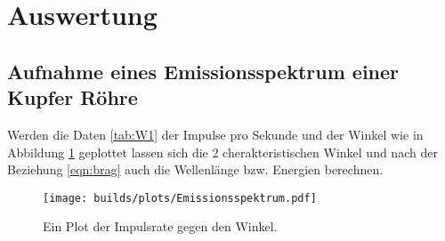 \section{Auswertung}

    \subsection{Aufnahme eines Emissionsspektrum einer Kupfer Röhre}

    \noindent Werden die Daten \ref{tab:W1} der Impulse pro Sekunde und der Winkel wie in Abbildung \ref{img:Spekt} geplottet lassen sich die 2 
    cherakteristischen Winkel und nach der Beziehung \ref{eqn:brag} auch die Wellenlänge bzw. Energien berechnen.
    
        \begin{figure}
            \centering
            \texttt{[image: builds/plots/Emissionsspektrum.pdf]}
            \caption{Ein Plot der Impulsrate gegen den Winkel.}
            \label{img:Spekt}
        \end{figure}